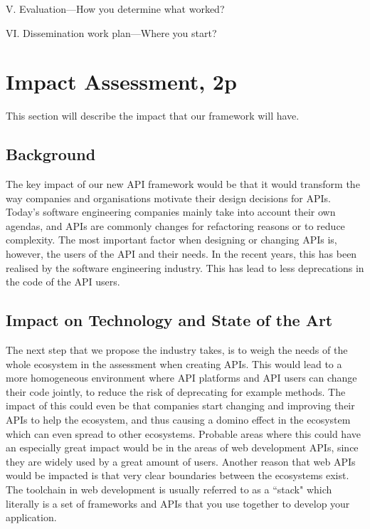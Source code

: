 \documentclass{article}
\begin{document}
V.
Evaluation—How you determine what worked?

VI.
Dissemination work plan—Where you start?
\newpage

\section{Impact Assessment, 2p}
This section will describe the impact that our framework will have. 

\subsection{Background}
The key impact of our new API framework would be that it would transform the way companies and organisations motivate their design decisions for APIs. Today's software engineering companies mainly take into account their own agendas, and APIs are commonly changes for refactoring reasons or to reduce complexity. The most important factor when designing or changing APIs is, however, the users of the API and their needs. In the recent years, this has been realised by the software engineering industry. This has lead to less deprecations in the code of the API users. 

\subsection{Impact on Technology and State of the Art}
The next step that we propose the industry takes, is to weigh the needs of the whole ecosystem in the assessment when creating APIs. This would lead to a more homogeneous environment where API platforms and API users can change their code jointly, to reduce the risk of deprecating for example methods. The impact of this could even be that companies start changing and improving their APIs to help the ecosystem, and thus causing a domino effect in the ecosystem which can even spread to other ecosystems. Probable areas where this could have an especially great impact would be in the areas of web development APIs, since they are widely used by a great amount of users. Another reason that web APIs would be impacted is that very clear boundaries between the ecosystems exist. The toolchain in web development is usually referred to as a ``stack" which literally is a set of frameworks and APIs that you use together to develop your application. 
\end{document}
